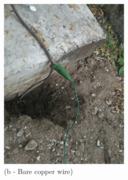 \begin{figure}[!h]
\begin{minipage}[b]{0.3\linewidth}
	\includegraphics[width=\textwidth]{figures/fig_ch04_elecaudit_grounding_barecopperwire}
	\caption*{(b - Bare copper wire)}
\end{minipage}
	\hspace{0.03cm}
\begin{minipage}[b]{0.3\linewidth}
	\centering

\end{minipage}
\end{figure}
